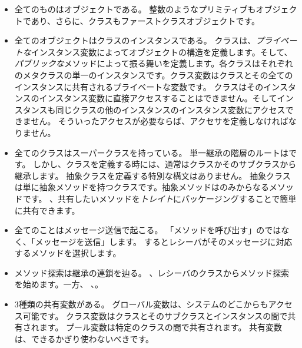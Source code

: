 \documentclass[a4paper,10pt,twoside]{book}
\begin{document}
\begin{itemize}
  \item 全てのものはオブジェクトである。
  整数のようなプリミティブもオブジェクトであり、さらに、クラスもファーストクラスオブジェクトです。

  \item 全てのオブジェクトはクラスのインスタンスである。
  クラスは、\emph{プライベートな}インスタンス変数によってオブジェクトの構造を定義します。そして、\emph{パブリックな}メソッドによって振る舞いを定義します。各クラスはそれぞれのメタクラスの単一のインスタンスです。クラス変数はクラスとその全てのインスタンスに共有されるプライベートな変数です。
  クラスはそのインスタンスのインスタンス変数に直接アクセスすることはできません。そしてインスタンスも同じクラスの他のインスタンスのインスタンス変数にアクセスできません。
  そういったアクセスが必要ならば、アクセサを定義しなければなりません。

  \item 全てのクラスはスーパークラスを持っている。
  単一継承の階層のルートはです。
  しかし、クラスを定義する時には、通常はクラスかそのサブクラスから継承します。
  抽象クラスを定義する特別な構文はありません。
  抽象クラスは単に抽象メソッドを持つクラスです。抽象メソッドはのみからなるメソッドです。
  、共有したいメソッドを\emph{トレイト}にパッケージングすることで簡単に共有できます。

  \item 全てのことはメッセージ送信で起こる。
	「メソッドを呼び出す」のではなく、「メッセージを送信」します。
	するとレシーバがそのメッセージに対応するメソッドを選択します。

  \item メソッド探索は継承の連鎖を辿る。
  、レシーバのクラスからメソッド探索を始めます。一方、
  、。
  
  \item 3種類の共有変数がある。
  		グローバル変数は、システムのどこからもアクセス可能です。
		クラス変数はクラスとそのサブクラスとインスタンスの間で共有されます。
		プール変数は特定のクラスの間で共有されます。
		共有変数は、できるかぎり使わないべきです。

\end{itemize}

\ifx\wholebook\relax\else
   
   
\end{document}
